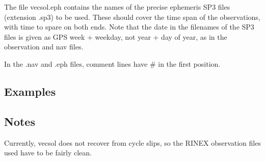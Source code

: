 The file vecsol.eph contains  the  names  of  the  precise ephemeris SP3 files (extension .sp3) to be used. These should cover the time span of the observations, with time to spare on both  ends. Note  that the date in the filenames of the SP3 files is given as GPS week + weekday, not year + day of year, as in the observation and nav files.

In the .nav and .eph files, comment lines have \# in the first position.

\subsection{Examples}

\subsection{Notes}
Currently, vecsol does not recover from cycle slips, so the RINEX observation files used have to be fairly clean.

%
